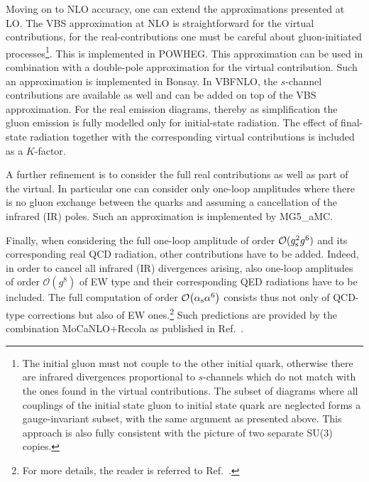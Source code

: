 Moving on to NLO accuracy, one can extend the approximations presented at LO.
The VBS approximation at NLO is straightforward for the virtual contributions, for the real-contributions one must be careful about gluon-initiated processes\footnote{The initial gluon must not couple to the other initial quark, otherwise there are infrared divergences proportional to $s$-channels which do not match with the ones found in the virtual contributions.
The subset of diagrams where all couplings of the initial state gluon to initial state quark are neglected forms a gauge-invariant subset, with the same argument as presented above. This approach is also fully consistent with the picture of two separate SU(3) copies.
}.
This is implemented in {\sc POWHEG}.
This approximation can be used in combination with a double-pole approximation \cite{Dittmaier:2015bfe} for the virtual contribution.
Such an approximation is implemented in {\sc Bonsay}.
In {\sc VBFNLO}, the $s$-channel contributions are available as well and can be
added on top of the VBS approximation. For the real emission diagrams, thereby
as simplification the gluon emission is fully modelled only for initial-state
radiation. The effect of final-state radiation together with the corresponding
virtual contributions is included as a $K$-factor. 

A further refinement is to consider the full real contributions as well as part of the virtual.
In particular one can consider only one-loop amplitudes where there is no gluon exchange between the quarks and 
assuming a cancellation of the infrared (IR) poles. Such an approximation is implemented by {\sc MG5\_aMC}.

Finally, when considering the full one-loop amplitude of order $\mathcal{O}(g_{\rm s}^2 g^6)$ and its corresponding real QCD radiation, other contributions have to be added.
Indeed, in order to cancel all infrared (IR) divergences arising, also one-loop amplitudes of order $\mathcal{O}(g^8)$ of EW type and their corresponding QED radiations have to be included.
The full computation of order $\mathcal{O}{\left(\alpha_\text{s} \alpha^{6}\right)}$ consists thus not only of QCD-type corrections but also of EW ones.\footnote{For more details, the reader is referred to Ref.~\cite{Biedermann:2017bss}.} 
Such predictions are provided by the combination {\sc MoCaNLO+Recola} as published in Ref.~\cite{Biedermann:2017bss}.


